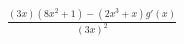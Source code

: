 \documentclass[preview]{standalone}
\begin{document}
\begin{align*}
\frac{(3x)(8x^2+1)-(2x^3+x)g'(x)}{(3x)^2}
\end{align*}
\end{document}
